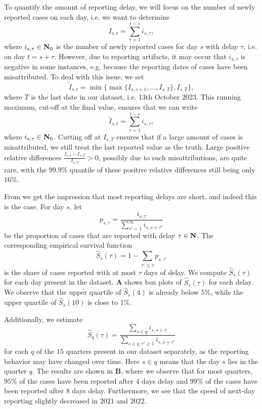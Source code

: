 To quantify the amount of reporting delay, we will focus on the number of newly reported cases on each day, i.e. we want to determine
$$
    I_{s,t} = \sum_{\tau = 1}^{t - s} i_{s,\tau},
$$
where $i_{s,\tau} \in \mathbf N_{0}$ is the number of newly reported cases for day $s$ with delay $\tau$, i.e. on day $t = s + \tau$. However, due to reporting artifacts, it may occur that $i_{s,\tau}$ is negative in some instances, e.g. because the reporting dates of cases have been misattributed. To deal with this issue, we set 
$$
    \tilde I_{s,t} = \min \{\max \{I_{s,s + 1}, \dots, I_{s, T}\}, I_{s, T}\},
$$
where $T$ is the last date in our dataset, i.e. 13th October 2023. This running maximum, cut-off at the final value, ensures that we can write 
$$
    \tilde I_{s,t} =  \sum_{\tau = 1}^{t - s} i_{s,\tau},
$$
where $i_{s,\tau} \in \mathbf N_0$. Cutting off at $I_{s,T}$ ensures that if a large amount of cases is misattributed, we still treat the last reported value as the truth. Large positive relative differences $ \frac{I_{s, t} - I_{s,T}}{I_{s,T}} > 0$, possibly due to such misattributions, are quite rare, with the $99.9\%$ quantile of these positive relative differences still being only $16\%$.

From  we get the impression that most reporting delays are short, and indeed this is the case. For day $s$, let
$$
    p_{s,\tau} = \frac{i_{s,\tau}}{\sum_{\tau' = 1}^\infty i_{s,s + \tau'}}
$$
be the proportion of cases that are reported with delay $\tau \in\mathbf N$. The corresponding empirical survival function 
$$
    \hat S_{s}(\tau) = 1 - \sum_{\tau' \leq \tau} p_{s,\tau'}
$$
is the share of cases reported with at most $\tau$ days of delay. We compute $\hat S_s(\tau)$ for each day present in the dataset.  \textbf{A} shows box plots of $\hat S_{s}(\tau)$ for each delay. We observe that the upper quartile of $\hat S_s(4)$ is already below $5\%$, while the upper quartile of $\hat S_s(10)$ is close to $1\%$. 

Additionally, we estimate 
$$
    \hat S_{q}(\tau) = \frac{\sum_{s \in q} i_{s,s + \tau}}{\sum_{s \in q, \tau' \geq 1} i_{s, s+ \tau'}}
$$
for each $q$ of the $15$ quarters present in our dataset separately, as the reporting behavior may have changed over time. Here $s\in q$ means that the day $s$ lies in the quarter $q$. The results are shown in  \textbf{B}, where we observe that for most quarters, $95\%$ of the cases have been reported after $4$ days delay and $99\%$ of the cases have been reported after $8$ days delay. 
Furthermore, we see that the speed of next-day reporting slightly decreased in $2021$ and $2022$.

